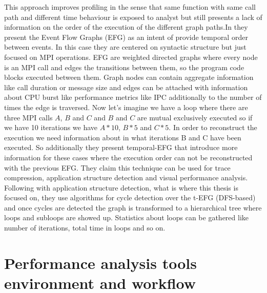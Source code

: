 \documentclass[10pt]{report}
\begin{document}
This approach improves profiling in the sense that same function with same call
path and different time behaviour is exposed to analyst but still presents a lack 
of information on the order of the execution of the different graph paths.In
\cite{aguilar2016event} they present the Event Flow Graphs (EFG) as an intent of
provide temporal order between events. In this case they are centered on
syntactic structure but just focused on MPI operations. EFG are
weighted directed graphs where every node is an MPI call and edges the
transitions between them, so the program code blocks executed between them.
Graph nodes can contain aggregate information like call duration or message size
and edges can be attached with information about CPU burst like performance
metrics like IPC additionally to the number of times the edge is traversed.
Now let's imagine we have a loop where there are three MPI calls $A$, $B$ and
$C$ and $B$ and $C$ are mutual exclusively executed so if we have 10 
iterations we have $A*10$, $B*5$ and $C*5$. In order to reconstruct the execution
we need information about in what iterations B and C have been executed.
So additionally they present temporal-EFG that introduce more
information for these cases where the execution order can not be reconstructed
with the previous EFG. They claim this technique can be used for trace
compression, application structure detection and visual performance analysis.
Following with application structure detection, what is where this thesis is
focused on, they use algorithms for cycle detection over the t-EFG (DFS-based)
and once cycles are detected the graph is transformed to a hierarchical tree
where loops and subloops are showed up. Statistics about loops can be gathered
like number of iterations, total time in loops and so on.




\section{Performance analysis tools environment and workflow}\label{s:pt_evironment}

\end{document}
